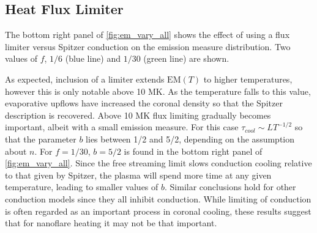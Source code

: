 \documentclass[apj]{emulateapj}
\begin{document}
	\subsection{Heat Flux Limiter}
	\label{subsec:hf_res}
	The bottom right panel of \autoref{fig:em_vary_all} shows the effect of using a flux limiter versus Spitzer conduction on the emission measure distribution. Two values of $f$, $1/6$ (blue line) and $1/30$ (green line)  are shown.
	\par As expected, inclusion of a limiter extends $\mathrm{EM}(T)$ to higher temperatures, however this is only notable above 10 MK. As the temperature falls to this value, evaporative upflows have increased the coronal density so that the Spitzer description is recovered. Above 10 MK flux limiting gradually becomes important, albeit with a small emission measure. For this case $\tau_{cool} \sim LT^{-1/2}$ so that the parameter $b$ lies between 1/2 and 5/2, depending on the assumption about $n$. For $f = 1/30$, $b = 5/2$ is found in the bottom right panel of \autoref{fig:em_vary_all}. Since the free streaming limit slows conduction cooling relative to that given by Spitzer, the plasma will spend more time at any given temperature, leading to smaller values of $b$. Similar conclusions hold for other conduction models \citep[e.g. the non-local model discussed in the coronal context by][]{karpen_nonlocal_1987,west_lifetime_2008} since they all inhibit conduction. While limiting of conduction is often regarded as an important process in coronal cooling, these results suggest that for nanoflare heating it may not be that important.
\end{document}
